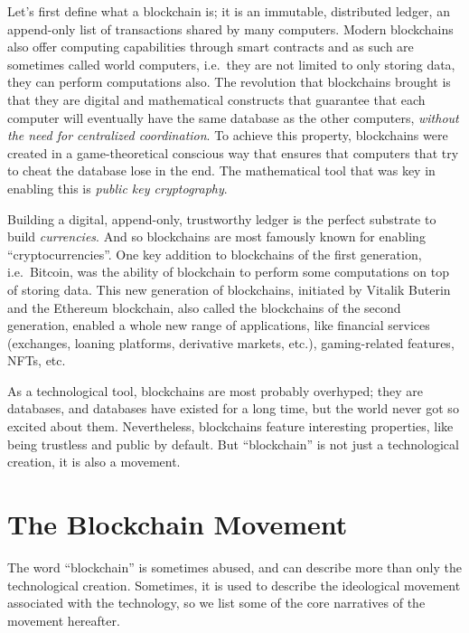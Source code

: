 Let's first define what a blockchain is; it is an immutable, distributed ledger, an append-only list of transactions shared by many computers.
Modern blockchains also offer computing capabilities through smart contracts and as such are sometimes called world computers, i.e.\ they are not limited to only storing data, they can perform computations also.
The revolution that blockchains brought is that they are digital and mathematical constructs that guarantee that each computer will eventually have the same database as the other computers, \emph{without the need for centralized coordination}.
To achieve this property, blockchains were created in a game-theoretical conscious way that ensures that computers that try to cheat the database lose in the end.
The mathematical tool that was key in enabling this is \emph{public key cryptography}.

Building a digital, append-only, trustworthy ledger is the perfect substrate to build \emph{currencies}.
And so blockchains are most famously known for enabling \enquote{cryptocurrencies}.
One key addition to blockchains of the first generation, i.e.\ Bitcoin, was the ability of blockchain to perform some computations on top of storing data.
This new generation of blockchains, initiated by Vitalik Buterin and the Ethereum blockchain, also called the blockchains of the second generation, enabled a whole new range of applications, like financial services (exchanges, loaning platforms, derivative markets, etc.), gaming-related features, NFTs, etc.

As a technological tool, blockchains are most probably overhyped; they are databases, and databases have existed for a long time, but the world never got so excited about them.
Nevertheless, blockchains feature interesting properties, like being trustless and public by default.
But \enquote{blockchain} is not just a technological creation, it is also a movement.

\section{The Blockchain Movement}

The word \enquote{blockchain} is sometimes abused, and can describe more than only the technological creation.
Sometimes, it is used to describe the ideological movement associated with the technology, so we list some of the core narratives of the movement hereafter.

